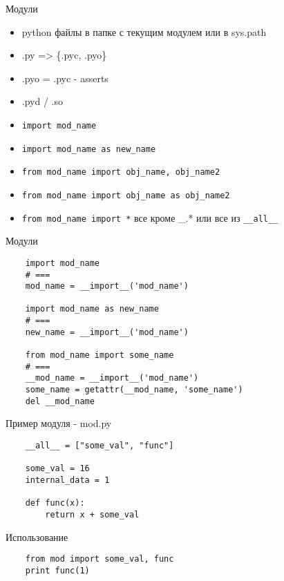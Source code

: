\documentclass{article}
\begin{document}
\LARGE

\begin{center} Модули \end{center}
\begin{itemize}
    \item python файлы в папке с текущим модулем или в sys.path
    \item .py => \{.pyc, .pyo\}
    \item .pyo = .pyc - asserts
    \item .pyd / .so
    \item \lstinline!import mod_name!
    \item \lstinline!import mod_name as new_name!
    \item \lstinline!from mod_name import obj_name, obj_name2!
    \item \lstinline!from mod_name import obj_name as obj_name2!
    \item \lstinline!from mod_name import *! все кроме \_.* или все из \lstinline!__all__!
\end{itemize}
\newpage

\begin{center} Модули \end{center}
\begin{lstlisting}
    import mod_name 
    # ===
    mod_name = __import__('mod_name')

    import mod_name as new_name 
    # ===  
    new_name = __import__('mod_name')

    from mod_name import some_name 
    # ===  
    __mod_name = __import__('mod_name')
    some_name = getattr(__mod_name, 'some_name')
    del __mod_name
\end{lstlisting}
\newpage

\begin{center} Пример модуля - mod.py \end{center}
\begin{lstlisting}
    __all__ = ["some_val", "func"]
    
    some_val = 16
    internal_data = 1

    def func(x):
        return x + some_val
\end{lstlisting}

\begin{center} Использование \end{center}
\begin{lstlisting}
    from mod import some_val, func
    print func(1)
\end{lstlisting}
\newpage
\end{document}
